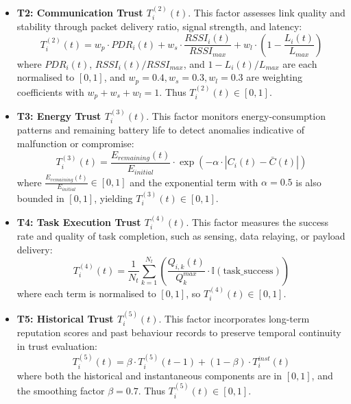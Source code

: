 \documentclass[notspecified,article,submit,moreauthors]{Definitions/mdpi}
\begin{document}
\begin{itemize}
\item \textbf{T2: Communication Trust $T_i^{(2)}(t)$}. This factor assesses link quality and stability through packet delivery ratio, signal strength, and latency:
\begin{equation}\label{eq:T2}
T_i^{(2)}(t) = w_p \cdot PDR_i(t) + w_s \cdot \frac{RSSI_i(t)}{RSSI_{max}} + w_l \cdot \left(1 - \frac{L_i(t)}{L_{max}}\right)
\end{equation}
where $PDR_i(t)$, $RSSI_i(t)/RSSI_{max}$, and $1 - L_i(t)/L_{max}$ are each normalised to $[0, 1]$, and $w_p = 0.4, w_s = 0.3, w_l = 0.3$ are weighting coefficients with $w_p + w_s + w_l = 1$. Thus $T_i^{(2)}(t) \in [0, 1]$.
\end{itemize}

\begin{itemize}
\item \textbf{T3: Energy Trust $T_i^{(3)}(t)$}. This factor monitors energy-consumption patterns and remaining battery life to detect anomalies indicative of malfunction or compromise:
\begin{equation}\label{eq:T3}
T_i^{(3)}(t) = \frac{E_{remaining}(t)}{E_{initial}} \cdot \exp\left(-\alpha \cdot \left|C_i(t) - \bar{C}(t)\right|\right)
\end{equation}
where $\frac{E_{remaining}(t)}{E_{initial}} \in [0, 1]$ and the exponential term with $\alpha = 0.5$ is also bounded in $[0, 1]$, yielding $T_i^{(3)}(t) \in [0, 1]$.
\end{itemize}

\begin{itemize}
\item \textbf{T4: Task Execution Trust $T_i^{(4)}(t)$}. This factor measures the success rate and quality of task completion, such as sensing, data relaying, or payload delivery:
\begin{equation}\label{eq:T4}
T_i^{(4)}(t) = \frac{1}{N_t} \sum_{k=1}^{N_t} \left( \frac{Q_{i,k}(t)}{Q_k^{max}} \cdot \mathbb{I}(\mathrm{task\_success}) \right)
\end{equation}
where each term is normalised to $[0, 1]$, so $T_i^{(4)}(t) \in [0, 1]$.
\end{itemize}

\begin{itemize}
\item \textbf{T5: Historical Trust $T_i^{(5)}(t)$}. This factor incorporates long-term reputation scores and past behaviour records to preserve temporal continuity in trust evaluation:
\begin{equation}\label{eq:T5}
T_i^{(5)}(t) = \beta \cdot T_i^{(5)}(t-1) + (1 - \beta) \cdot T_i^{inst}(t)
\end{equation}
where both the historical and instantaneous components are in $[0, 1]$, and the smoothing factor $\beta = 0.7$. Thus $T_i^{(5)}(t) \in [0, 1]$.
\end{itemize}
\end{document}
